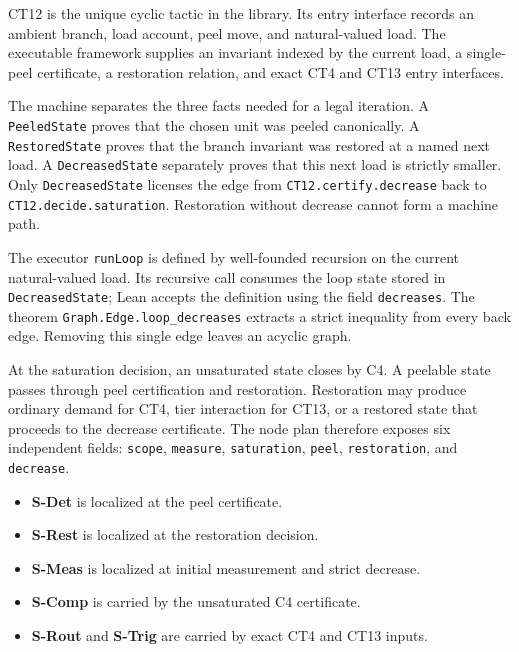 \documentclass[
  11pt,
]{article}
\providecommand{\tightlist}{%
  \setlength{\itemsep}{0pt}\setlength{\parskip}{0pt}}
\theoremstyle{definition}
\begin{document}
CT12 is the unique cyclic tactic in the library.  Its entry interface records
an ambient branch, load account, peel move, and natural-valued load.  The
executable framework supplies an invariant indexed by the current load, a
single-peel certificate, a restoration relation, and exact CT4 and CT13 entry
interfaces.

The machine separates the three facts needed for a legal iteration.  A
\texttt{PeeledState} proves that the chosen unit was peeled canonically.  A
\texttt{RestoredState} proves that the branch invariant was restored at a
named next load.  A \texttt{DecreasedState} separately proves that this next
load is strictly smaller.  Only \texttt{DecreasedState} licenses the edge from
\texttt{CT12.certify.decrease} back to
\texttt{CT12.decide.saturation}.  Restoration without decrease cannot form a
machine path.

The executor \texttt{runLoop} is defined by well-founded recursion on the
current natural-valued load.  Its recursive call consumes the loop state stored
in \texttt{DecreasedState}; Lean accepts the definition using the field
\texttt{decreases}.  The theorem
\texttt{Graph.Edge.loop\_decreases} extracts a strict inequality from every
back edge.  Removing this single edge leaves an acyclic graph.

At the saturation decision, an unsaturated state closes by C4.  A peelable
state passes through peel certification and restoration.  Restoration may
produce ordinary demand for CT4, tier interaction for CT13, or a restored state
that proceeds to the decrease certificate.  The node plan therefore exposes
six independent fields: \texttt{scope}, \texttt{measure},
\texttt{saturation}, \texttt{peel}, \texttt{restoration}, and
\texttt{decrease}.

\begin{itemize}
\tightlist
\item \textbf{S-Det} is localized at the peel certificate.
\item \textbf{S-Rest} is localized at the restoration decision.
\item \textbf{S-Meas} is localized at initial measurement and strict decrease.
\item \textbf{S-Comp} is carried by the unsaturated C4 certificate.
\item \textbf{S-Rout} and \textbf{S-Trig} are carried by exact CT4 and CT13 inputs.
\end{itemize}
\end{document}
